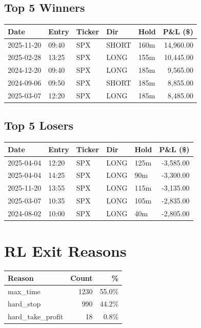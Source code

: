 \documentclass[11pt,a4paper,twoside]{article}
\begin{document}
\subsection{Top 5 Winners}
\noindent\begin{center}
\begin{tabular}{>{\color{txtmain}}l llll r}
\toprule
\rowcolor{cardbg}
\textbf{Date} & \textbf{Entry} & \textbf{Ticker} & \textbf{Dir} & \textbf{Hold} & \textbf{P\&L (\$)} \\
\midrule
2025-11-20 & 09:40 & SPX & SHORT & 160m & \textcolor{wingreen}{14,960.00} \\
2025-02-28 & 13:25 & SPX & LONG & 155m & \textcolor{wingreen}{10,445.00} \\
2024-12-20 & 09:40 & SPX & LONG & 185m & \textcolor{wingreen}{9,565.00} \\
2024-09-06 & 09:50 & SPX & SHORT & 185m & \textcolor{wingreen}{8,855.00} \\
2025-03-07 & 12:20 & SPX & LONG & 185m & \textcolor{wingreen}{8,485.00} \\
\bottomrule
\end{tabular}
\end{center}
\subsection{Top 5 Losers}
\noindent\begin{center}
\begin{tabular}{>{\color{txtmain}}l llll r}
\toprule
\rowcolor{cardbg}
\textbf{Date} & \textbf{Entry} & \textbf{Ticker} & \textbf{Dir} & \textbf{Hold} & \textbf{P\&L (\$)} \\
\midrule
2025-04-04 & 12:20 & SPX & LONG & 125m & \textcolor{lossred}{-3,585.00} \\
2025-04-04 & 14:25 & SPX & LONG & 90m & \textcolor{lossred}{-3,300.00} \\
2025-11-20 & 13:55 & SPX & LONG & 115m & \textcolor{lossred}{-3,135.00} \\
2025-03-07 & 10:35 & SPX & LONG & 105m & \textcolor{lossred}{-2,835.00} \\
2024-08-02 & 10:00 & SPX & LONG & 40m & \textcolor{lossred}{-2,805.00} \\
\bottomrule
\end{tabular}
\end{center}
\clearpage
\section{RL Exit Reasons}
\noindent\begin{center}
\begin{tabular}{>{\color{txtmain}}l rr}
\toprule
\rowcolor{cardbg}
\textbf{Reason} & \textbf{Count} & \textbf{\%} \\
\midrule
max\_time & 1230 & 55.0\% \\
hard\_stop & 990 & 44.2\% \\
hard\_take\_profit & 18 & 0.8\% \\
\bottomrule
\end{tabular}
\end{center}
\end{document}
